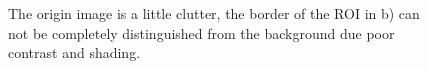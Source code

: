 \begin{figure}[htbp]
  \begin{minipage}[t]{0.5\linewidth} 
    \centering 
  \end{minipage}%
  \begin{minipage}[t]{0.5\linewidth} 
    \centering 
  \end{minipage}
\caption[Segmentation a flower petal from a cluster of flowers]{The
  origin image is a little clutter, the border of the ROI in b) can
  not be completely distinguished from the background due poor
  contrast and shading.}
\label{fig:flower_m}
\end{figure}

